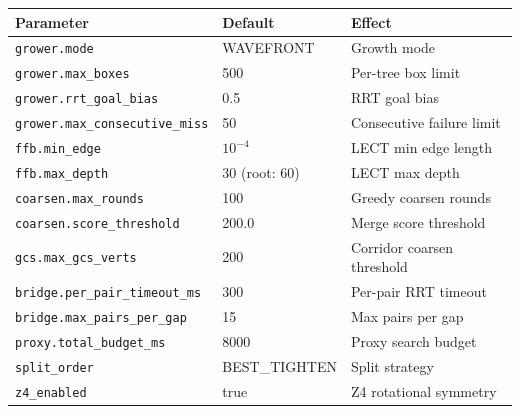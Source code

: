 \documentclass[journal]{IEEEtran}
\begin{document}
\begin{table}[ht]
\centering
\small
\begin{tabularx}{\columnwidth}{@{}llX@{}}
\toprule
\textbf{Parameter} & \textbf{Default} & \textbf{Effect} \\
\midrule
\texttt{grower.mode} & WAVEFRONT & Growth mode \\
\texttt{grower.max\_boxes} & 500 & Per-tree box limit \\
\texttt{grower.rrt\_goal\_bias} & 0.5 & RRT goal bias \\
\texttt{grower.max\_consecutive\_miss} & 50 & Consecutive failure limit \\
\texttt{ffb.min\_edge} & $10^{-4}$ & LECT min edge length \\
\texttt{ffb.max\_depth} & 30 (root: 60) & LECT max depth \\
\texttt{coarsen.max\_rounds} & 100 & Greedy coarsen rounds \\
\texttt{coarsen.score\_threshold} & 200.0 & Merge score threshold \\
\texttt{gcs.max\_gcs\_verts} & 200 & Corridor coarsen threshold \\
\texttt{bridge.per\_pair\_timeout\_ms} & 300 & Per-pair RRT timeout \\
\texttt{bridge.max\_pairs\_per\_gap} & 15 & Max pairs per gap \\
\texttt{proxy.total\_budget\_ms} & 8000 & Proxy search budget \\
\texttt{split\_order} & BEST\_TIGHTEN & Split strategy \\
\texttt{z4\_enabled} & true & Z4 rotational symmetry \\
\bottomrule
\end{tabularx}
\end{table}
\end{document}
